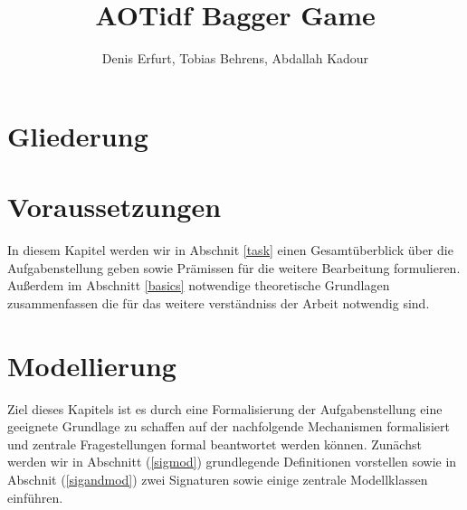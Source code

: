 \documentclass[sigconf]{acmart}
\theoremstyle{break}
\begin{document}
\title{AOTidf Bagger Game}
\author{Denis Erfurt, Tobias Behrens, Abdallah Kadour}

\begin{abstract}
  \noindent
\end{abstract}



\maketitle

\section{Gliederung}

\section{Voraussetzungen}
In diesem Kapitel werden wir in Abschnit \ref{task} einen Gesamtüberblick über die Aufgabenstellung geben sowie Prämissen für die weitere Bearbeitung formulieren. Außerdem im Abschnitt \ref{basics} notwendige theoretische Grundlagen zusammenfassen die für das weitere verständniss der Arbeit notwendig sind.



\section{Modellierung}
\label{mod}
Ziel dieses Kapitels ist es durch eine Formalisierung der Aufgabenstellung eine geeignete Grundlage zu schaffen auf der nachfolgende Mechanismen formalisiert und zentrale Fragestellungen formal beantwortet werden können.
 Zunächst werden wir in Abschnitt (\ref{sigmod}) grundlegende Definitionen vorstellen sowie in Abschnit (\ref{sigandmod}) zwei Signaturen sowie einige zentrale Modellklassen einführen.
\end{document}
